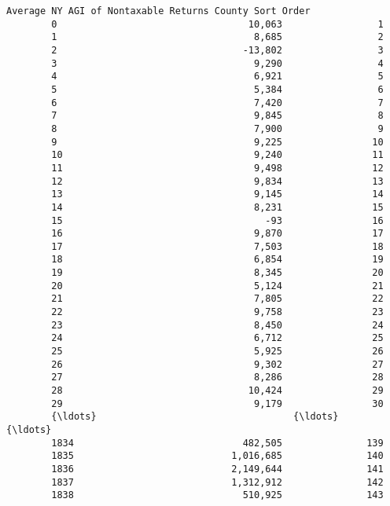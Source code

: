 \documentclass[11pt]{article}
\begin{document}
\begin{Verbatim}[commandchars=\\\{\}]
             Average NY AGI of Nontaxable Returns County Sort Order  
        0                                  10,063                 1  
        1                                   8,685                 2  
        2                                 -13,802                 3  
        3                                   9,290                 4  
        4                                   6,921                 5  
        5                                   5,384                 6  
        6                                   7,420                 7  
        7                                   9,845                 8  
        8                                   7,900                 9  
        9                                   9,225                10  
        10                                  9,240                11  
        11                                  9,498                12  
        12                                  9,834                13  
        13                                  9,145                14  
        14                                  8,231                15  
        15                                    -93                16  
        16                                  9,870                17  
        17                                  7,503                18  
        18                                  6,854                19  
        19                                  8,345                20  
        20                                  5,124                21  
        21                                  7,805                22  
        22                                  9,758                23  
        23                                  8,450                24  
        24                                  6,712                25  
        25                                  5,925                26  
        26                                  9,302                27  
        27                                  8,286                28  
        28                                 10,424                29  
        29                                  9,179                30  
        {\ldots}                                   {\ldots}               {\ldots}  
        1834                              482,505               139  
        1835                            1,016,685               140  
        1836                            2,149,644               141  
        1837                            1,312,912               142  
        1838                              510,925               143  

\end{Verbatim}
\end{document}
